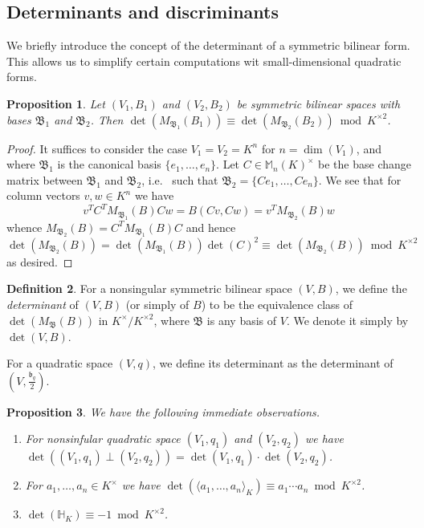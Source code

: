\documentclass[12pt, leqno, british]{amsart}
\theoremstyle{definition}
\newtheorem{defi}{Definition}[subsection]
\theoremstyle{plain}
\newtheorem{prop}[defi]{Proposition}
\theoremstyle{remark}
\newcommand{\mf}{\mathfrak}
\newcommand{\mbb}{\mathbb}
\begin{document}
\subsection{Determinants and discriminants}
We briefly introduce the concept of the determinant of a symmetric bilinear form.
This allows us to simplify certain computations wit small-dimensional quadratic forms.
\begin{prop}
Let $(V_1, B_1)$ and $(V_2, B_2)$ be symmetric bilinear spaces with bases $\mf{B}_1$ and $\mf{B}_2$.
Then $\det (M_\mf{B_1}(B_1)) \equiv \det (M_{\mf{B}_2}(B_2)) \bmod K^{\times 2}$.
\end{prop}
\begin{proof}
It suffices to consider the case $V_1 = V_2 = K^n$ for $n = \dim(V_1)$, and where $\mf{B}_1$ is the canonical basis $\lbrace e_1, \ldots, e_n \rbrace$.
Let $C \in \mbb{M}_n(K)^\times$ be the base change matrix between $\mf{B}_1$ and $\mf{B}_2$, i.e. ~such that $\mf{B}_2 = \lbrace Ce_1, \ldots, Ce_n \rbrace$.
We see that for column vectors $v, w \in K^n$ we have
\begin{displaymath}
v^T C^T M_{\mf{B}_{1}}(B) C w = B(Cv, Cw) = v^T M_{\mf{B}_2}(B) w
\end{displaymath}
whence $M_{\mf{B}_2}(B) = C^T M_{\mf{B}_{1}}(B) C$ and hence $\det(M_{\mf{B}_2}(B)) = \det(M_{\mf{B}_{1}}(B)) \det(C)^2 \equiv \det(M_{\mf{B}_2}(B)) \bmod K^{\times 2}$ as desired.
\end{proof}
\begin{defi}
For a nonsingular symmetric bilinear space $(V, B)$, we define the \emph{determinant} of $(V, B)$ (or simply of $B$) to be the equivalence class of $\det(M_{\mf{B}}(B))$ in $K^\times/K^{\times 2}$, where $\mf{B}$ is any basis of $V$.
We denote it simply by $\det(V, B)$.

For a quadratic space $(V, q)$, we define its determinant as the determinant of $(V, \frac{\mf{b}_q}{2})$.
\end{defi}
\begin{prop}\label{P:det-computation-rules}
We have the following immediate observations.
\begin{enumerate}
\item For nonsinfular quadratic space $(V_1, q_1)$ and $(V_2, q_2)$ we have $\det ((V_1, q_1) \perp (V_2, q_2)) = \det(V_1, q_1) \cdot \det(V_2, q_2)$.
\item For $a_1, \ldots, a_n \in K^\times$ we have $\det(\langle a_1, \ldots, a_n \rangle_K) \equiv a_1 \cdots a_n \bmod K^{\times 2}$.
\item $\det(\mbb{H}_K) \equiv -1 \bmod K^{\times 2}$.
\end{enumerate}
\end{prop}
\end{document}
